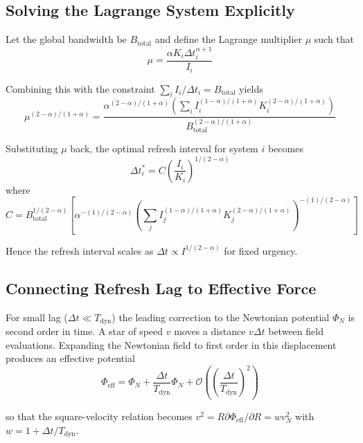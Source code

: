 \documentclass[twocolumn,prd,amsmath,amssymb,aps,superscriptaddress,nofootinbib]{revtex4-2}
\begin{document}
\subsection{Solving the Lagrange System Explicitly}

Let the global bandwidth be $B_{\text{total}}$ and define the Lagrange multiplier $\mu$ such that
\begin{equation}
\mu = \frac{\alpha K_i \Delta t_i^{\alpha+1}}{I_i}
\end{equation}

Combining this with the constraint $\sum_i I_i / \Delta t_i = B_{\text{total}}$ yields
\begin{equation}
\mu^{(2-\alpha)/(1+\alpha)} = \frac{\alpha^{(2-\alpha)/(1+\alpha)} \left( \sum_i I_i^{(1-\alpha)/(1+\alpha)} K_i^{(2-\alpha)/(1+\alpha)} \right)}{B_{\text{total}}^{(2-\alpha)/(1+\alpha)}}
\end{equation}

Substituting $\mu$ back, the optimal refresh interval for system $i$ becomes
\begin{equation}
\Delta t_i^* = C \left( \frac{I_i}{K_i} \right)^{1/(2-\alpha)}
\end{equation}
where 
\begin{equation}
C = B_{\text{total}}^{1/(2-\alpha)} \left[ \alpha^{-(1)/(2-\alpha)} \left(\sum_j I_j^{(1-\alpha)/(1+\alpha)} K_j^{(2-\alpha)/(1+\alpha)} \right)^{-(1)/(2-\alpha)} \right]
\end{equation}

Hence the refresh interval scales as $\Delta t \propto I^{1/(2-\alpha)}$ for fixed urgency.

\subsection{Connecting Refresh Lag to Effective Force}

For small lag ($\Delta t \ll T_{\text{dyn}}$) the leading correction to the Newtonian potential $\Phi_N$ is second order in time. A star of speed $v$ moves a distance $v\Delta t$ between field evaluations. Expanding the Newtonian field to first order in this displacement produces an effective potential
\begin{equation}
\Phi_{\text{eff}} = \Phi_N + \frac{\Delta t}{T_{\text{dyn}}} \Phi_N + \mathcal{O}\left(\left(\frac{\Delta t}{T_{\text{dyn}}}\right)^2\right)
\end{equation}

so that the square-velocity relation becomes $v^2 = R \partial\Phi_{\text{eff}}/\partial R = w v_N^2$ with $w = 1 + \Delta t/T_{\text{dyn}}$.
\end{document}
